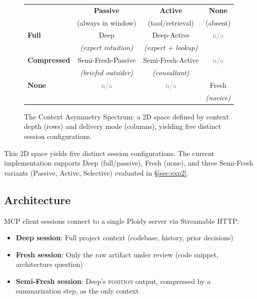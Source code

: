 \documentclass[11pt]{article}
\begin{document}
\begin{figure}[t]
\centering
\caption{The Context Asymmetry Spectrum: a 2D space defined by context depth (rows) and delivery mode (columns), yielding five distinct session configurations.}
\label{fig:2d-matrix}
\vspace{0.5em}
\small
\begin{tabular}{@{} >{\bfseries}l c c c @{}}
\toprule
& \textbf{Passive} & \textbf{Active} & \textbf{None} \\
& \footnotesize(always in window) & \footnotesize(tool/retrieval) & \footnotesize(absent) \\
\midrule
Full
  & Deep & Deep-Active & {\textcolor{gray}{n/a}} \\
  & \footnotesize\textit{(expert intuition)} & \footnotesize\textit{(expert + lookup)} & \\[6pt]
Compressed
  & Semi-Fresh-Passive & Semi-Fresh-Active & {\textcolor{gray}{n/a}} \\
  & \footnotesize\textit{(briefed outsider)} & \footnotesize\textit{(consultant)} & \\[6pt]
None
  & \textcolor{gray}{n/a} & \textcolor{gray}{n/a} & Fresh \\
  & & & \footnotesize\textit{(novice)} \\
\bottomrule
\end{tabular}
\end{figure}

This 2D space yields five distinct session configurations. The current implementation supports Deep (full/passive), Fresh (none), and three Semi-Fresh variants (Passive, Active, Selective) evaluated in \S\ref{sec:exp2}.

\subsection{Architecture}
\label{sec:architecture}

MCP client sessions connect to a single Ploidy server via Streamable HTTP:

\begin{itemize}[leftmargin=1.5em]
  \item \textbf{Deep session}: Full project context (codebase, history, prior decisions)
  \item \textbf{Fresh session}: Only the raw artifact under review (code snippet, architecture question)
  \item \textbf{Semi-Fresh session}: Deep's \textsc{position} output, compressed by a summarization step, as the only context
\end{itemize}
\end{document}
